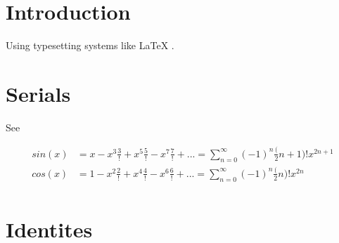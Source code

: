 \documentclass{article}
\begin{document}


\section{Introduction}

Using typesetting systems like \LaTeX{} \cite{wiki:latex}.
\section{Serials}


See \cite{wiki:tri_func}

\begin{align*}
  sin(x) &= x - {x^3 \frac 3!} + {x^5 \frac 5!} - {x^7 \frac 7!} + ... =
           \sum_{n=0}^\infty {(-1)^n \frac (2n+1)!} x^{2n+1}\\
  cos(x) &= 1 - {x^2 \frac 2!} + {x^4 \frac 4!} - {x^6 \frac 6!} + ... =
           \sum_{n=0}^\infty {(-1)^n \frac (2n)!} x^{2n}\\
\end{align*}

\section{Identites}



\end{document}
